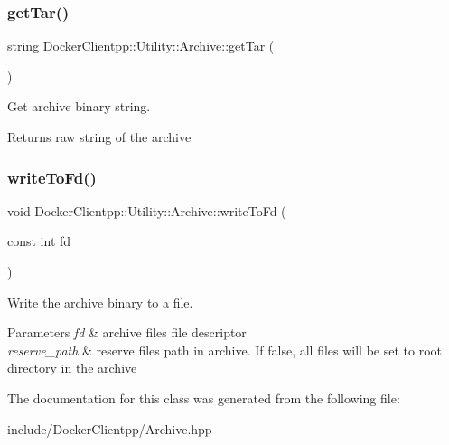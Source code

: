 \subsubsection{\texorpdfstring{getTar()}{getTar()}}
{\footnotesize\ttfamily string Docker\+Clientpp\+::\+Utility\+::\+Archive\+::get\+Tar (\begin{DoxyParamCaption}{ }\end{DoxyParamCaption})}



Get archive binary string. 

\begin{DoxyReturn}{Returns}
raw string of the archive 
\end{DoxyReturn}
\mbox{\label{classDockerClientpp_1_1Utility_1_1Archive_abe92387b2d2c32c378d50e2cdb618fcc}} 
\subsubsection{\texorpdfstring{writeToFd()}{writeToFd()}}
{\footnotesize\ttfamily void Docker\+Clientpp\+::\+Utility\+::\+Archive\+::write\+To\+Fd (\begin{DoxyParamCaption}\item[{const int}]{fd }\end{DoxyParamCaption})}



Write the archive binary to a file. 


\begin{DoxyParams}{Parameters}
{\em fd} & archive file\textquotesingle{}s file descriptor \\
\hline
{\em reserve\+\_\+path} & reserve file\textquotesingle{}s path in archive. If false, all files will be set to root directory in the archive \\
\hline
\end{DoxyParams}


The documentation for this class was generated from the following file\+:\begin{DoxyCompactItemize}
\item 
include/\+Docker\+Clientpp/Archive.\+hpp\end{DoxyCompactItemize}

